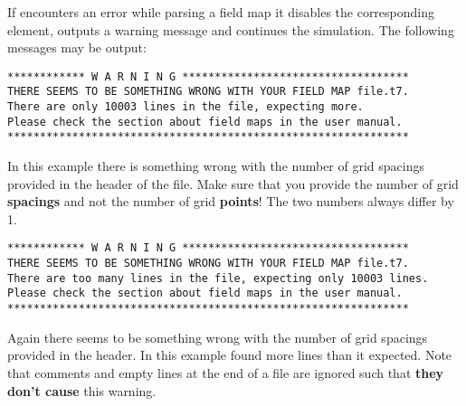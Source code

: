 If \opalt encounters an error while parsing a field map it disables the corresponding element, outputs a warning message and continues the simulation. The following messages may be output:
\begin{fmpage}\footnotesize
\begin{verbatim}
************ W A R N I N G ***********************************
THERE SEEMS TO BE SOMETHING WRONG WITH YOUR FIELD MAP file.t7.
There are only 10003 lines in the file, expecting more.
Please check the section about field maps in the user manual.
**************************************************************
\end{verbatim}
\end{fmpage}
In this example there is something wrong with the number of grid spacings provided in the header of the file. Make sure that you provide the number of grid {\bf spacings} and not the number of grid {\bf points}! The two numbers always differ by 1.
\begin{fmpage} \footnotesize
\begin{verbatim}
************ W A R N I N G ***********************************
THERE SEEMS TO BE SOMETHING WRONG WITH YOUR FIELD MAP file.t7.
There are too many lines in the file, expecting only 10003 lines.
Please check the section about field maps in the user manual.
**************************************************************
\end{verbatim}
\end{fmpage}
Again there seems to be something wrong with the number of grid spacings provided in the header. In this example \opalt found more lines than it expected. Note that comments and empty lines at the end of a file are ignored such that {\bf they don't cause} this warning.

